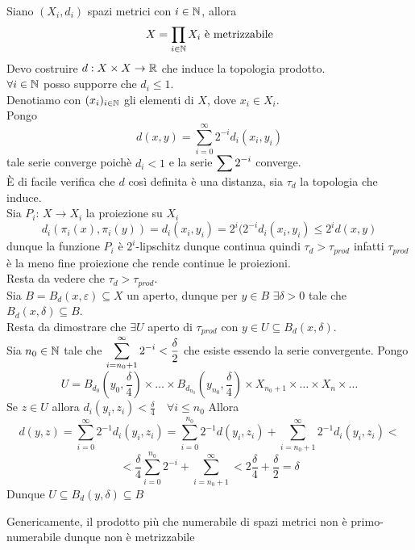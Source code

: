 \newpage
\begin{thm}Siano $(X_i,d_i)$ spazi metrici con $i\in \mathbb{N}$, allora
$$ X =\prod_{i \in \mathbb{N}} X_i \text{ \`e metrizzabile}$$
\proof Devo costruire $d:X\times X \to \mathbb{R}$ che induce la topologia prodotto.\\
$\forall i \in \mathbb{N}$ posso supporre che $d_i \leq 1$.\\
Denotiamo con $\displaystyle (x_i)_{i \in \mathbb{N}} $ gli elementi  di $X$, dove $x_i \in X_i$.\\
Pongo
$$ d(x,y)= \sum_{i=0}^\infty 2^{-i} d_i(x_i,y_i)$$ 
tale serie converge poich\`e $d_i<1$ e la serie $\displaystyle \sum 2^{-i}$ converge.\\
\`E di facile verifica che $d$ cos\`i definita \`e una distanza, sia $\tau_d$ la topologia che induce.\\
Sia $P_i:\, X\to X_i$ la proiezione su $X_i$ 
$$ d_i(\pi_i(x),\pi_i(y))= d_i(x_i,y_i) = 2^i(2^{-i} d_i(x_i,y_i) \leq 2^i d(x,y)$$
dunque la funzione $P_i$ \`e $2^i$-lipschitz dunque continua quindi $\tau_d > \tau_{prod}$
infatti $\tau_{prod}$ \`e la meno fine proiezione che rende continue le proiezioni.\\
Resta da vedere che $\tau_d> \tau_{prod}$.\\
Sia $B=B_d(x,\varepsilon)\subseteq X$ un aperto, dunque  per  $y \in B$  $\exists \delta>0 $ tale che $B_d(x,\delta)\subseteq B$.\\ Resta da dimostrare che $\exists U $ aperto di $\tau_{prod}$ con $y\in U \subseteq B_d(x,\delta)$.\\
Sia $n_0\in \mathbb{N}$ tale che $\displaystyle \sum_{i=n_0+1}^\infty 2^{-i} <\frac{\delta}{2}$ che esiste essendo la serie convergente.
Pongo
$$ U = B_{d_0}\left( y_0, \frac{\delta}{4} \right)\times \dots \times 
 B_{d_{n_0}}\left( y_{n_0}, \frac{\delta}{4}\right) \times X_{n_0+1}\times \dots \times X_n \times \dots$$
 Se $z\in U $ allora $d_i(y_i,z_i)< \frac{\delta}{4} \quad  \forall i \leq n_0 $
Allora
$$ d(y,z) = \sum_{i=0}^\infty 2^{-1} d_i(y_i,z_i) = \sum_{i=0}^{n_0} 2^{-1}d(y_i,z_i)+ \sum_{i=n_0+1}^\infty 2^{-1} d_i(y_i,z_i)<$$ 
$$< \frac{\delta}{4} \sum_{i=0}^{n_0} 2^{-i}+ \sum_{i=n_0+1}^\infty < 2 \frac{\delta}{4} + \frac{\delta}{2}=\delta$$
Dunque $U\subseteq B_d(y, \delta)\subseteq B $
\endproof
 \end{thm}
 \begin{oss}Genericamente, il prodotto pi\`u che numerabile di spazi metrici non \`e primo-numerabile dunque non \`e metrizzabile
 \end{oss}

